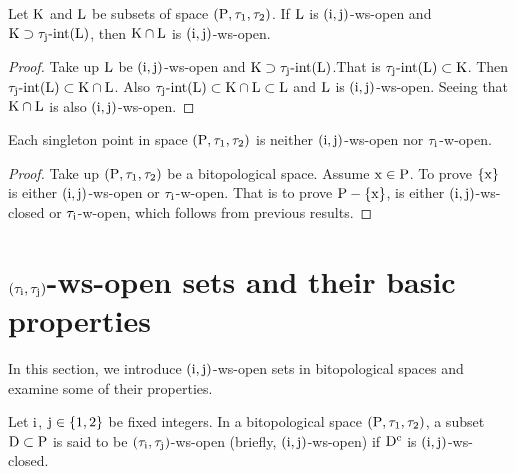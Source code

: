 \begin{coro}\label{coro8.2.2}
Let $\mathrm{K}$ and $\mathrm{L}$ be subsets of space $(\mathrm{P}, \tau_1, \tau_2 )$. If $\mathrm{L}$ is $(\mathrm{i}, \mathrm{j})$-ws-open and $\mathrm{K} \supset  \tau_{\mathrm{j}}\text{-int}(\mathrm{L})$, then $\mathrm{K}\cap \mathrm{L}$ is $(\mathrm{i}, \mathrm{j})$-ws-open.
\end{coro}

\begin{proof}
Take up $\mathrm{L}$ be $(\mathrm{i}, \mathrm{j})$-ws-open and $\mathrm{K} \supset \tau_{\mathrm{j}}\text{-int}(\mathrm{L})$.That is $\tau_{\mathrm{j}}\text{-int}(\mathrm{L})\subset\mathrm{K}$. Then $\tau_{\mathrm{j}}\text{-int}(\mathrm{L})\subset \mathrm{K}\cap \mathrm{L}$. Also $\tau_{\mathrm{j}}\text{-int}(\mathrm{L}) \subset \mathrm{K}\cap \mathrm{L}\subset\mathrm{L}$ and $\mathrm{L}$ is $(\mathrm{i}, \mathrm{j})$-ws-open. Seeing that $\mathrm{K}\cap \mathrm{L}$ is also $(\mathrm{i}, \mathrm{j})$-ws-open.
\end{proof}

\begin{thm}\label{thm8.2.17}
Each singleton point in space $(\mathrm{P}, \tau_1, \tau_2 )$ is neither $(\mathrm{i}, \mathrm{j})$-ws-open nor $\tau_{\mathrm{i}}$-w-open.
\end{thm}

\begin{proof}
Take up $(\mathrm{P}, \tau_1, \tau_2 )$ be a bitopological space. Assume $\mathrm{x}\in\mathrm{P}$. To prove $\{\mathrm{x}\}$ is either $(\mathrm{i}, \mathrm{j})$-ws-open or $\tau_{\mathrm{i}}$-w-open. That is to prove $\mathrm{P}-\{\mathrm{x}\}$, is either $(\mathrm{i}, \mathrm{j})$-ws-closed or $\tau_{\mathrm{i}}$-w-open, which follows from previous results.
\end{proof}

\section[$(\tau_{\TSi}, \tau_{\TSj} )$-ws-open sets and their basic properties]{\boldmath$(\tau_{\TSi}, \tau_{\TSj} )$-ws-open sets and their basic properties}\label{sec8.3}

In this section, we introduce $(\mathrm{i}, \mathrm{j})$-ws-open sets in bitopological spaces and examine some of their properties.

\begin{dfn}\label{defi8.3.1}
Let $\mathrm{i}$, $\mathrm{j}\in\{1, 2\}$ be fixed integers. In a bitopological space $(\mathrm{P}, \tau_1, \tau_2 )$, a subset $\mathrm{D} \subset \mathrm{P}$ is said to be $(\tau_{\TSi}, \tau_{\TSj} )$-ws-open (briefly, $(\mathrm{i}, \mathrm{j})$-ws-open) if $\mathrm{D}^{\text{c}}$ is $(\mathrm{i}, \mathrm{j})$-ws-closed.
\end{dfn}

